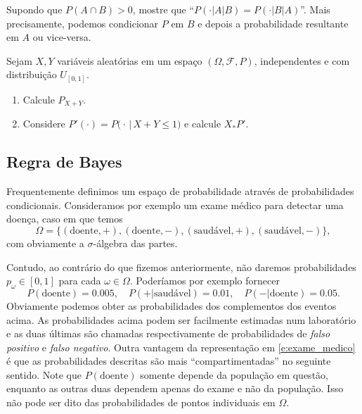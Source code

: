 \begin{exercise}
  Supondo que $P(A \cap B) > 0$, mostre que ``$P(\cdot|A|B) = P(\cdot|B|A)$''.
  Mais precisamente, podemos condicionar $P$ em $B$ e depois a probabilidade resultante em $A$ ou vice-versa.
\end{exercise}

\begin{exercise}
  Sejam $X, Y$ vari\'aveis aleat\'orias em um espaço $(\Omega, \mathcal{F}, P)$, independentes e com distribuição $U_{[0,1]}$.
  \begin{enumerate}[\quad a)]
  \item Calcule $ P_{X+Y}$.
  \item Considere $P'(\cdot) = P\big(\cdot \, | \, X + Y \leq 1 \big)$ e calcule $X_* P'$.
  \end{enumerate}
\end{exercise}


\subsection{Regra de Bayes}

Frequentemente definimos um espaço de probabilidade através de probabilidades condicionais.
Consideramos por exemplo um exame médico para detectar uma doença, caso em que temos
\begin{equation}
  \Omega = \{(\text{doente}, +), (\text{doente}, -), (\text{saudável}, +), (\text{saudável}, -)\},
\end{equation}
com obviamente a $\sigma$-álgebra das partes.

Contudo, ao contrário do que fizemos anteriormente, não daremos probabilidades $p_\omega \in [0,1]$ para cada $\omega \in \Omega$.
Poderíamos por exemplo fornecer
\begin{equation}
  \label{e:exame_medico}
  P(\text{doente}) = 0.005, \quad P( + | \text{saudável}) = 0.01, \quad P( - | \text{doente}) = 0.05.
\end{equation}
Obviamente podemos obter as probabilidades dos complementos dos eventos acima.
As probabilidades acima podem ser facilmente estimadas num laboratório e as duas últimas são chamadas respectivamente de probabilidades de \emph{falso positivo} e \emph{falso negativo}.
Outra vantagem da representação em \eqref{e:exame_medico} é que as probabilidades descritas são mais ``compartimentadas'' no seguinte sentido.
Note que $P(\text{doente})$ somente depende da população em questão, enquanto as outras duas dependem apenas do exame e não da população.
Isso não pode ser dito das probabilidades de pontos individuais em $\Omega$.

